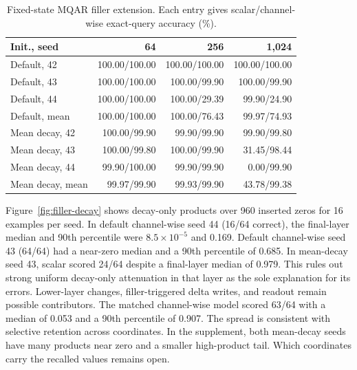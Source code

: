 \documentclass[conference]{IEEEtran}
\begin{document}
\begin{table}[t]
\caption{Fixed-state MQAR filler extension. Each entry gives scalar/channel-wise exact-query accuracy (\%).}
\label{tab:length}
\centering
\scriptsize
\setlength{\tabcolsep}{4pt}
\begin{tabular}{lrrr}
\toprule
Init., seed & 64 & 256 & 1,024 \\
\midrule
Default, 42 & 100.00/100.00 & 100.00/100.00 & 100.00/100.00 \\
Default, 43 & 100.00/100.00 & 100.00/99.90 & 100.00/99.90 \\
Default, 44 & 100.00/100.00 & 100.00/29.39 & 99.90/24.90 \\
Default, mean & 100.00/100.00 & 100.00/76.43 & 99.97/74.93 \\
\midrule
Mean decay, 42 & 100.00/99.90 & 99.90/99.90 & 99.90/99.80 \\
Mean decay, 43 & 100.00/99.80 & 100.00/99.90 & 31.45/98.44 \\
Mean decay, 44 & 99.90/100.00 & 99.90/99.90 & 0.00/99.90 \\
Mean decay, mean & 99.97/99.90 & 99.93/99.90 & 43.78/99.38 \\
\bottomrule
\end{tabular}
\end{table}

Figure~\ref{fig:filler-decay} shows decay-only products over 960 inserted zeros for 16 examples per seed. In default channel-wise seed 44 (16/64 correct), the final-layer median and 90th percentile were $8.5\times10^{-5}$ and 0.169. Default channel-wise seed 43 (64/64) had a near-zero median and a 90th percentile of 0.685. In mean-decay seed 43, scalar scored 24/64 despite a final-layer median of 0.979. This rules out strong uniform decay-only attenuation in that layer as the sole explanation for its errors. Lower-layer changes, filler-triggered delta writes, and readout remain possible contributors. The matched channel-wise model scored 63/64 with a median of 0.053 and a 90th percentile of 0.907. The spread is consistent with selective retention across coordinates. In the supplement, both mean-decay seeds have many products near zero and a smaller high-product tail. Which coordinates carry the recalled values remains open.
\end{document}
